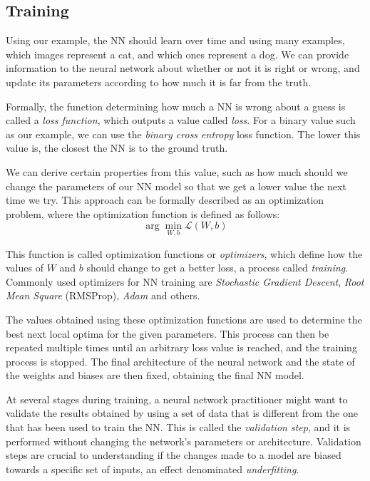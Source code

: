 \subsection{Training}

Using our example, the NN should learn over time and using many examples, which images represent a cat, and which ones represent a dog.
We can provide information to the neural network about whether or not it is right or wrong, and update its parameters according to how much it is far from the truth.

Formally, the function determining how much a NN is wrong about a guess is called a \textit{loss function}, which outputs a value called \textit{loss}.
For a binary value such as our example, we can use the \textit{binary cross entropy} loss function.
The lower this value is, the closest the NN is to the ground truth.

We can derive certain properties from this value, such as how much should we change the parameters of our NN model so that we get a lower value the next time we try.
This approach can be formally described as an optimization problem, where the optimization function is defined as follows:
\begin{equation}
    \arg \min_{W, b} \mathcal{L} (W, b)
\end{equation}

This function is called optimization functions or \textit{optimizers}, which define how the values of $W$ and $b$ should change to get a better loss, a process called \textit{training}.
Commonly used optimizers for NN training are \textit{Stochastic Gradient Descent}, \textit{Root Mean Square} (RMSProp), \textit{Adam} and others.

The values obtained using these optimization functions are used to determine the best next local optima for the given parameters.
This process can then be repeated multiple times until an arbitrary loss value is reached, and the training process is stopped.
The final architecture of the neural network and the state of the weights and biases are then fixed, obtaining the final NN model.

At several stages during training, a neural network practitioner might want to validate the results obtained by using a set of data that is different from the one that has been used to train the NN.
This is called the \textit{validation step}, and it is performed without changing the network's parameters or architecture.
Validation steps are crucial to understanding if the changes made to a model are biased towards a specific set of inputs, an effect denominated \textit{underfitting}.

